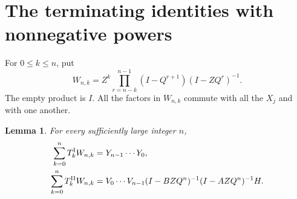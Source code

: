 \documentclass[11pt]{article}
\newtheorem{lemma}{Lemma}
\begin{document}
\section*{The terminating identities with nonnegative powers}
For $0\leq k\leq n$, put
\begin{equation}\label{weights}
 W_{n,k}=Z^k\prod_{r=n-k}^{n-1}(I-Q^{r+1})(I-ZQ^r)^{-1}.
\end{equation}
The empty product is $I$. All the factors in $W_{n,k}$ commute with
all the $X_j$ and with one another.

\begin{lemma}\label{finite}
For every sufficiently large integer $n$,
\begin{align}
 \sum_{k=0}^nT_k^{\rm I}W_{n,k}&=Y_{n-1}\cdots Y_0,\label{finiteI}\\
 \sum_{k=0}^nT_k^{\rm II}W_{n,k}
 &=V_0\cdots V_{n-1}(I-BZQ^n)^{-1}(I-AZQ^n)^{-1}H.
 \label{finiteII}
\end{align}
\end{lemma}
\end{document}

